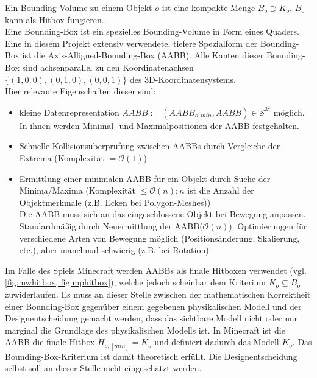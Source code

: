 Ein Bounding-Volume zu einem Objekt $o$ ist eine kompakte Menge $B_o \supset K_{o}$. $B_o$ kann als Hitbox fungieren.\\
Eine Bounding-Box ist ein spezielles Bounding-Volume in Form eines Quaders.\\
Eine in diesem Projekt extensiv verwendete, tiefere Spezialform der Bounding-Box ist die Axis-Alligned-Bounding-Box (AABB). Alle Kanten dieser Bounding-Box sind achsenparallel zu den Koordinatenachsen $\{(1,0,0), (0,1,0), (0,0,1)\}$ des 3D-Koordinatensystems.\\
Hier relevante Eigenschaften dieser sind:
\begin{itemize}
	\item kleine Datenrepresentation $AABB := (AABB_{o, min}, AABB) \in \mathcal{S}^{3^2}$ möglich.
		 In ihnen werden Minimal- und Maximalpositionen der AABB festgehalten.
	\item Schnelle Kollisionsüberprüfung zwischen AABBs durch Vergleiche der Extrema (Komplexität $= \mathcal{O}(1)$)
	\item Ermittlung einer minimalen AABB für ein Objekt durch Suche der Minima/Maxima (Komplexität $\le \mathcal{O}(n); n $ ist die Anzahl der Objektmerkmale (z.B. Ecken bei Polygon-Meshes))\\
		Die AABB muss sich an das eingeschlossene Objekt bei Bewegung anpassen. Standardmäßig durch Neuermittlung der AABB($\mathcal{O}(n)$). Optimierungen für verschiedene Arten von Bewegung möglich (Positionsänderung, Skalierung, etc.), aber manchmal schwierig (z.B. bei Rotation).
\end{itemize}

Im Falle des Spiels Minecraft werden AABBs als finale Hitboxen verwendet (vgl. \ref{fig:mwhitbox, fig:mphitbox}), welche jedoch scheinbar dem Kriterium $K_o \subseteq B_o$ zuwiderlaufen. Es muss an dieser Stelle zwischen der mathematischen Korrektheit einer Bounding-Box gegenüber einem gegebenen physikalischen Modell und der Designentscheidung gemacht werden, dass das sichtbare Modell nicht oder nur marginal die Grundlage des physikalischen Modells ist. In Minecraft ist die AABB die finale Hitbox  $H_{o, [min]} = K_o$ und definiert dadurch das Modell $K_o$. Das Bounding-Box-Kriterium ist damit theoretisch erfüllt. Die Designentscheidung selbst soll an dieser Stelle nicht eingeschätzt werden.

